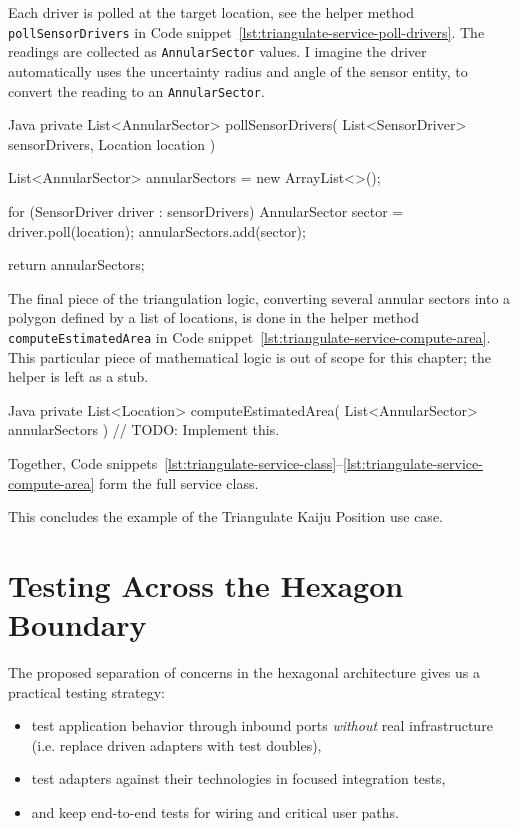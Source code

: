 Each driver is polled at the target location, see the helper method \texttt{pollSensorDrivers} in Code snippet~\ref{lst:triangulate-service-poll-drivers}. The readings are collected as \texttt{AnnularSector} values. I imagine the driver automatically uses the uncertainty radius and angle of the sensor entity, to convert the reading to an \texttt{AnnularSector}.

\begin{ridercode}{Java}
private List<AnnularSector> pollSensorDrivers(
    List<SensorDriver> sensorDrivers,
    Location location
)
{
    List<AnnularSector> annularSectors = new ArrayList<>();

    for (SensorDriver driver : sensorDrivers)
    {
        AnnularSector sector = driver.poll(location);
        annularSectors.add(sector);
    }

    return annularSectors;
}
\end{ridercode}
\label{lst:triangulate-service-poll-drivers}

The final piece of the triangulation logic, converting several annular sectors into a polygon defined by a list of locations, is done in the helper method \texttt{computeEstimatedArea} in Code snippet~\ref{lst:triangulate-service-compute-area}. This particular piece of mathematical logic is out of scope for this chapter; the helper is left as a stub.

\begin{ridercode}{Java}
private List<Location> computeEstimatedArea(
    List<AnnularSector> annularSectors
)
{
    // TODO: Implement this.
}
\end{ridercode}
\label{lst:triangulate-service-compute-area}

Together, Code snippets~\ref{lst:triangulate-service-class}--\ref{lst:triangulate-service-compute-area} form the full service class.

This concludes the example of the Triangulate Kaiju Position use case.

\section{Testing Across the Hexagon Boundary}
\label{sec:hexagonal_testing}

The proposed separation of concerns in the hexagonal architecture gives us a practical testing strategy:\autocite{huttunen2026hexagonal}
\begin{itemize}
    \item test application behavior through inbound ports \textit{without} real infrastructure (i.e. replace driven adapters with test doubles),
    \item test adapters against their technologies in focused integration tests,
    \item and keep end-to-end tests for wiring and critical user paths.
\end{itemize}

